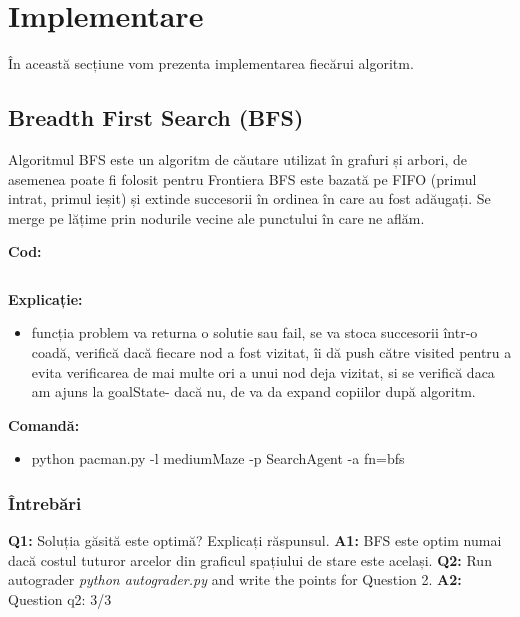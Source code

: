 \section{Implementare}
În această secțiune vom prezenta implementarea fiecărui algoritm.
\newline


\subsection{Breadth First Search (BFS)}
Algoritmul BFS este un algoritm de căutare utilizat în grafuri și arbori, de asemenea poate fi folosit pentru 
Frontiera BFS este bazată pe FIFO (primul intrat, primul ieșit) și extinde succesorii în ordinea în care au fost adăugați.
Se merge pe lățime prin nodurile vecine ale punctului în care ne aflăm.\newline

\textbf{Cod:}
\inputminted[linenos]{python}{code/02_bfs.py}


\textbf{Explicație:}
\begin{itemize}
    \setlength\itemsep{0em}
    \item funcția problem va returna o solutie sau fail, se va stoca succesorii într-o coadă, verifică dacă fiecare nod a fost vizitat, îi dă push către visited pentru a evita verificarea de mai multe ori a unui nod deja vizitat, si se verifică daca am ajuns la goalState- dacă nu, de va da expand copiilor după algoritm.

\end{itemize}


\textbf{Comandă:}
\begin{itemize}
    \setlength\itemsep{0em}
    \item python pacman.py -l mediumMaze -p SearchAgent -a fn=bfs
        
\end{itemize}

\subsubsection{Întrebări}

\textbf{Q1:} Soluția găsită este optimă? Explicați răspunsul.
\newline
\textbf{A1:} BFS este optim numai dacă costul tuturor arcelor din graficul spațiului de stare este același.
\newline
\newline
\textbf{Q2:} Run autograder \textit{python autograder.py} and write the points for Question 2.
\newline
\textbf{A2:} Question q2: 3/3
\newline
\vspace{0.75cm}
\pagebreak

